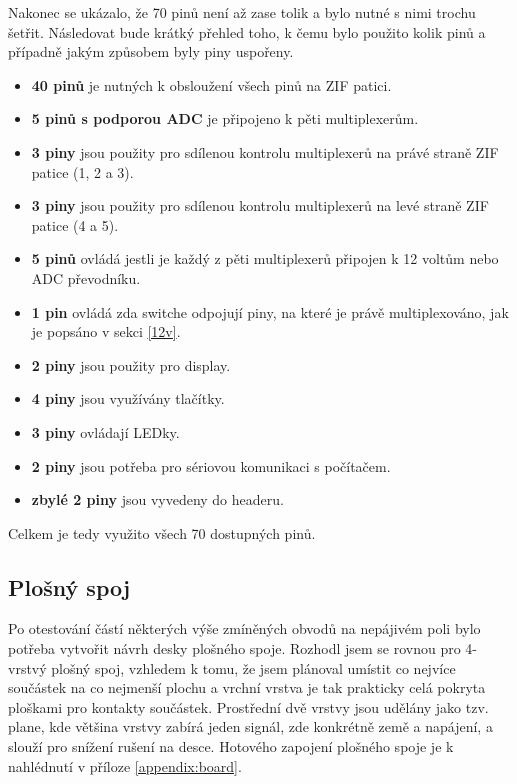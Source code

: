 \documentclass[11pt,a4paper,twoside,openright]{report}
\begin{document}
Nakonec se ukázalo, že 70 pinů není až zase tolik a bylo nutné s nimi trochu šetřit. Následovat bude krátký přehled toho, k čemu bylo použito kolik pinů a případně jakým způsobem byly piny uspořeny.

\begin {itemize}
\item \textbf{40 pinů} je nutných k obsloužení všech pinů na ZIF patici.
\item \textbf{5 pinů s podporou ADC} je připojeno k pěti multiplexerům.
\item \textbf{3 piny} jsou použity pro sdílenou kontrolu multiplexerů na právé straně ZIF patice (1, 2 a 3). \footnotemark{}
\item \textbf{3 piny} jsou použity pro sdílenou kontrolu multiplexerů na levé straně ZIF patice (4 a 5). \footnotemark[\value{footnote}]
\item \textbf{5 pinů} ovládá jestli je každý z pěti multiplexerů připojen k 12 voltům nebo ADC převodníku.
\item \textbf{1 pin} ovládá zda switche odpojují piny, na které je právě multiplexováno, jak je popsáno v sekci \ref{12v}.
\item \textbf{2 piny} jsou použity pro display.
\item \textbf{4 piny} jsou využívány tlačítky.
\item \textbf{3 piny} ovládají LEDky.
\item \textbf{2 piny} jsou potřeba pro sériovou komunikaci s počítačem.
\item \textbf{zbylé 2 piny} jsou vyvedeny do headeru.
\end {itemize}

Celkem je tedy využito všech 70 dostupných pinů.

\subsection {Plošný spoj}

Po otestování částí některých výše zmíněných obvodů na nepájivém poli bylo potřeba vytvořit návrh desky plošného spoje. Rozhodl jsem se rovnou pro 4-vrstvý plošný spoj, vzhledem k tomu, že jsem plánoval umístit co nejvíce součástek na co nejmenší plochu a vrchní vrstva je tak prakticky celá pokryta ploškami pro kontakty součástek. Prostřední dvě vrstvy jsou udělány jako tzv. plane, kde většina vrstvy zabírá jeden signál, zde konkrétně země a napájení, a slouží pro snížení rušení na desce. Hotového zapojení plošného spoje je k nahlédnutí v příloze \ref{appendix:board}.
\end{document}
